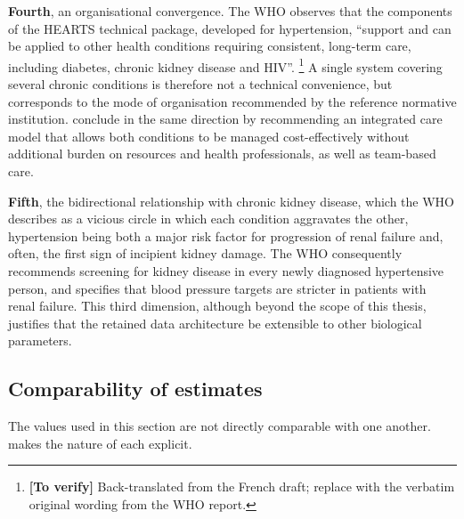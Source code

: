 \documentclass[12pt,a4paper,oneside]{report}
\newcommand{\verify}[1]{\footnote{\textbf{[To verify]} #1}}
\begin{document}
\textbf{Fourth}, an organisational convergence. The WHO observes that the components of the HEARTS technical package, developed for hypertension, ``support and can be applied to other health conditions requiring consistent, long-term care, including diabetes, chronic kidney disease and HIV''.%
\verify{Back-translated from the French draft; replace with the verbatim original wording from the WHO report.}
A single system covering several chronic conditions is therefore not a technical convenience, but corresponds to the mode of organisation recommended by the reference normative institution. \textcite{hinneh2023} conclude in the same direction by recommending an integrated care model that allows both conditions to be managed cost-effectively without additional burden on resources and health professionals, as well as team-based care.

\textbf{Fifth}, the bidirectional relationship with chronic kidney disease, which the WHO describes as a vicious circle in which each condition aggravates the other, hypertension being both a major risk factor for progression of renal failure and, often, the first sign of incipient kidney damage. The WHO consequently recommends screening for kidney disease in every newly diagnosed hypertensive person, and specifies that blood pressure targets are stricter in patients with renal failure. This third dimension, although beyond the scope of this thesis, justifies that the retained data architecture be extensible to other biological parameters.

\subsection{Comparability of estimates}\label{sec:comparability}

The values used in this section are not directly comparable with one another.  makes the nature of each explicit.
\end{document}
